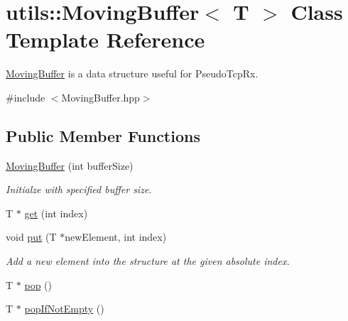 \hypertarget{classutils_1_1MovingBuffer}{
\section{utils::MovingBuffer$<$ T $>$ Class Template Reference}
\label{classutils_1_1MovingBuffer}
}


\hyperlink{classutils_1_1MovingBuffer}{MovingBuffer} is a data structure useful for PseudoTcpRx.  




{\ttfamily \#include $<$MovingBuffer.hpp$>$}

\subsection*{Public Member Functions}
\begin{DoxyCompactItemize}
\item 
\hypertarget{classutils_1_1MovingBuffer_aca199bfe148e820a848890ff0a519106}{
\hyperlink{classutils_1_1MovingBuffer_aca199bfe148e820a848890ff0a519106}{MovingBuffer} (int bufferSize)}
\label{classutils_1_1MovingBuffer_aca199bfe148e820a848890ff0a519106}

\begin{DoxyCompactList}\small\item\em Initialze with specified buffer size. \item\end{DoxyCompactList}\item 
T $\ast$ \hyperlink{classutils_1_1MovingBuffer_a7e65ffd8a9f4a5c428906e1da1931677}{get} (int index)
\item 
\hypertarget{classutils_1_1MovingBuffer_abe649be205205a783620c2d140b15114}{
void \hyperlink{classutils_1_1MovingBuffer_abe649be205205a783620c2d140b15114}{put} (T $\ast$newElement, int index)}
\label{classutils_1_1MovingBuffer_abe649be205205a783620c2d140b15114}

\begin{DoxyCompactList}\small\item\em Add a new element into the structure at the given absolute index. \item\end{DoxyCompactList}\item 
T $\ast$ \hyperlink{classutils_1_1MovingBuffer_afe0ca8bb2226b0039a265efe9952ac64}{pop} ()
\item 
\hypertarget{classutils_1_1MovingBuffer_a2388032df8ddb8b3a88692a81aaf7786}{
T $\ast$ \hyperlink{classutils_1_1MovingBuffer_a2388032df8ddb8b3a88692a81aaf7786}{popIfNotEmpty} ()}
\label{classutils_1_1MovingBuffer_a2388032df8ddb8b3a88692a81aaf7786}


\end{DoxyCompactItemize}
